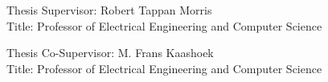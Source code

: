\documentclass[fontsize=12pt,paper=letter]{scrartcl}
\begin{document}
\begin{titlepage}
\begin{flushleft}
  \vspace{0.5\baselineskip}
  Thesis Supervisor: Robert Tappan Morris\\
  Title: Professor of Electrical Engineering and Computer Science

  \vspace{0.2\baselineskip}

  Thesis Co-Supervisor: M. Frans Kaashoek\\
  Title: Professor of Electrical Engineering and Computer Science
  \end{flushleft}
\end{titlepage}
\end{document}
